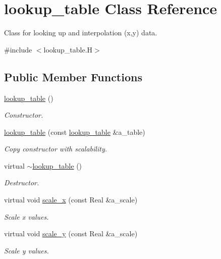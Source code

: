 \hypertarget{classlookup__table}{}\section{lookup\+\_\+table Class Reference}
\label{classlookup__table}


Class for looking up and interpolation (x,y) data.  




{\ttfamily \#include $<$lookup\+\_\+table.\+H$>$}

\subsection*{Public Member Functions}
\begin{DoxyCompactItemize}
\item 
\hyperlink{classlookup__table_a0717a79ef52d35b9077a84293a7ac371}{lookup\+\_\+table} ()
\begin{DoxyCompactList}\small\item\em Constructor. \end{DoxyCompactList}\item 
\hyperlink{classlookup__table_a8f1e2fdaff4f3a4568b1825ba588bac1}{lookup\+\_\+table} (const \hyperlink{classlookup__table}{lookup\+\_\+table} \&a\+\_\+table)
\begin{DoxyCompactList}\small\item\em Copy constructor with scalability. \end{DoxyCompactList}\item 
virtual \hyperlink{classlookup__table_a64dc8a0c9b457a19545a0a0741524abd}{$\sim$lookup\+\_\+table} ()
\begin{DoxyCompactList}\small\item\em Destructor. \end{DoxyCompactList}\item 
virtual void \hyperlink{classlookup__table_a748cd732030be6df9fff99d68f7bea27}{scale\+\_\+x} (const Real \&a\+\_\+scale)
\begin{DoxyCompactList}\small\item\em Scale x values. \end{DoxyCompactList}\item 
virtual void \hyperlink{classlookup__table_a2558c7a97bffe54626983fb6c9748f25}{scale\+\_\+y} (const Real \&a\+\_\+scale)
\begin{DoxyCompactList}\small\item\em Scale y values. \end{DoxyCompactList}\item 

\end{DoxyCompactItemize}
